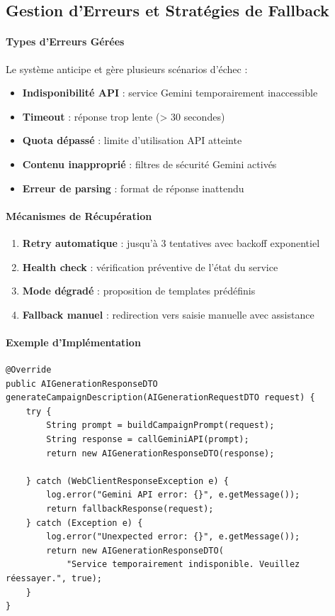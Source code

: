 \subsection{Gestion d'Erreurs et Stratégies de Fallback}

\paragraph{Types d'Erreurs Gérées}
Le système anticipe et gère plusieurs scénarios d'échec :
\begin{itemize}[label=\textbullet]
    \item \textbf{Indisponibilité API} : service Gemini temporairement inaccessible
    \item \textbf{Timeout} : réponse trop lente (> 30 secondes)
    \item \textbf{Quota dépassé} : limite d'utilisation API atteinte
    \item \textbf{Contenu inapproprié} : filtres de sécurité Gemini activés
    \item \textbf{Erreur de parsing} : format de réponse inattendu
\end{itemize}

\paragraph{Mécanismes de Récupération}
\begin{enumerate}
    \item \textbf{Retry automatique} : jusqu'à 3 tentatives avec backoff exponentiel
    \item \textbf{Health check} : vérification préventive de l'état du service
    \item \textbf{Mode dégradé} : proposition de templates prédéfinis
    \item \textbf{Fallback manuel} : redirection vers saisie manuelle avec assistance
\end{enumerate}

\paragraph{Exemple d'Implémentation}
\begin{verbatim}
@Override
public AIGenerationResponseDTO generateCampaignDescription(AIGenerationRequestDTO request) {
    try {
        String prompt = buildCampaignPrompt(request);
        String response = callGeminiAPI(prompt);
        return new AIGenerationResponseDTO(response);

    } catch (WebClientResponseException e) {
        log.error("Gemini API error: {}", e.getMessage());
        return fallbackResponse(request);
    } catch (Exception e) {
        log.error("Unexpected error: {}", e.getMessage());
        return new AIGenerationResponseDTO(
            "Service temporairement indisponible. Veuillez réessayer.", true);
    }
}
\end{verbatim}

